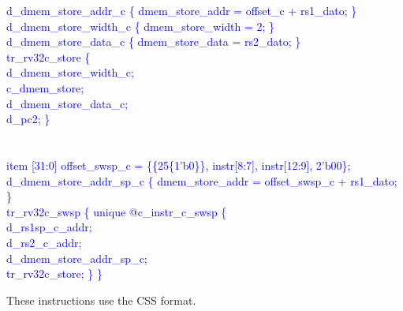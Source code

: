 \textcolor{blue}{
\indent d\_dmem\_store\_addr\_c \{ dmem\_store\_addr = offset\_c + rs1\_dato; \}\\%
\indent d\_dmem\_store\_width\_c \{ dmem\_store\_width = 2; \}\\%
\indent d\_dmem\_store\_data\_c \{ dmem\_store\_data = rs2\_dato; \}\\%
\indent tr\_rv32c\_store \{ \\%
\indent \hspace{\parindent} d\_dmem\_store\_width\_c; \\%
\indent \hspace{\parindent} c\_dmem\_store; \\%
\indent \hspace{\parindent} d\_dmem\_store\_data\_c; \\%
\indent \hspace{\parindent} d\_pc2; \}\\%
\\
\\
\indent item [31:0] offset\_swsp\_c = \{\{25\{1'b0\}\}, instr[8:7], instr[12:9], 2'b00\};\\%
\indent d\_dmem\_store\_addr\_sp\_c \{ dmem\_store\_addr = offset\_swsp\_c + rs1\_dato; \}\\%
\indent tr\_rv32c\_swsp \{ unique @c\_instr\_c\_swsp \{ \\%
\indent \hspace{\parindent} d\_rs1sp\_c\_addr; \\%
\indent \hspace{\parindent} d\_rs2\_c\_addr; \\%
\indent \hspace{\parindent} d\_dmem\_store\_addr\_sp\_c; \\%
\indent \hspace{\parindent} tr\_rv32c\_store; \} \} \\%
}

These instructions use the CSS format.

